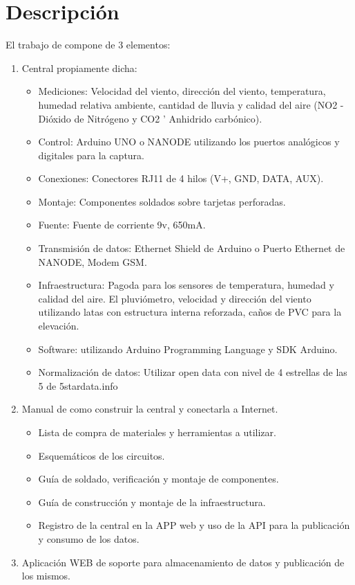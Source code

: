 \documentclass[11pt, spanish]{report}
\begin{document}
\section{Descripción}
El trabajo de compone de 3 elementos:
\begin{enumerate}
\item Central propiamente dicha:
\begin{itemize}
\item Mediciones: Velocidad del viento, dirección del viento, temperatura, humedad relativa ambiente, cantidad de lluvia y calidad del aire (NO2 - Dióxido de Nitrógeno y CO2 ' Anhidrido carbónico).
\item Control: Arduino UNO o NANODE utilizando los puertos analógicos y digitales para la captura.
\item Conexiones: Conectores RJ11 de 4 hilos (V+, GND, DATA, AUX).
\item Montaje: Componentes soldados sobre tarjetas perforadas.
\item Fuente: Fuente de corriente 9v, 650mA.
\item Transmisión de datos: Ethernet Shield de Arduino o Puerto Ethernet de NANODE, Modem GSM.
\item Infraestructura: Pagoda para los sensores de temperatura, humedad y calidad del aire. El pluviómetro, velocidad y dirección del viento utilizando latas con estructura interna reforzada, caños de PVC para la elevación.
\item Software: utilizando Arduino Programming Language y SDK Arduino.
\item Normalización de datos: Utilizar open data con nivel de 4 estrellas de las 5 de 5stardata.info
\end{itemize}
\item Manual de como construir la central y conectarla a Internet.
\begin{itemize}
\item Lista de compra de materiales y herramientas a utilizar.
\item Esquemáticos de los circuitos.
\item Guía de soldado, verificación y montaje de componentes.
\item Guía de construcción y montaje de la infraestructura.
\item Registro de la central en la APP web y uso de la API para la publicación y consumo de los datos.
\end{itemize}
\item Aplicación WEB de soporte para almacenamiento de datos y publicación de los mismos.

\end{enumerate}
\end{document}

